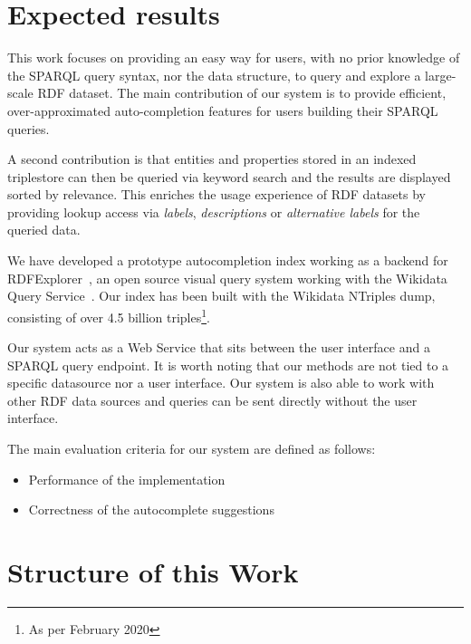 \section{Expected results}

This work focuses on providing an easy way for users, with no prior knowledge of the SPARQL query syntax, nor the data structure, to query and explore a large-scale RDF dataset. The main contribution of our system is to provide efficient, over-approximated auto-completion features for users building their SPARQL queries. 

A second contribution is that entities and properties stored in an indexed triplestore can then be queried via keyword search and the results are displayed sorted by relevance. This enriches the usage experience of RDF datasets by providing lookup access via \textit{labels}, \textit{descriptions} or \textit{alternative labels} for the queried data.

We have developed a prototype autocompletion index working as a backend for RDFExplorer~\cite{Vargas2019}, an open source visual query system working with the Wikidata Query Service~\cite{wikidataQueryService}. Our index has been built with the Wikidata NTriples dump, consisting of over 4.5 billion triples\footnote{As per February 2020}. 

Our system acts as a Web Service that sits between the user interface and a SPARQL query endpoint. It is worth noting that our methods are not tied to a specific datasource nor a user interface. Our system is also able to work with other RDF data sources and queries can be sent directly without the user interface.

The main evaluation criteria for our system are defined as follows:

\begin{itemize}
    \item Performance of the implementation
    \item Correctness of the autocomplete suggestions
\end{itemize}

\section{Structure of this Work}

